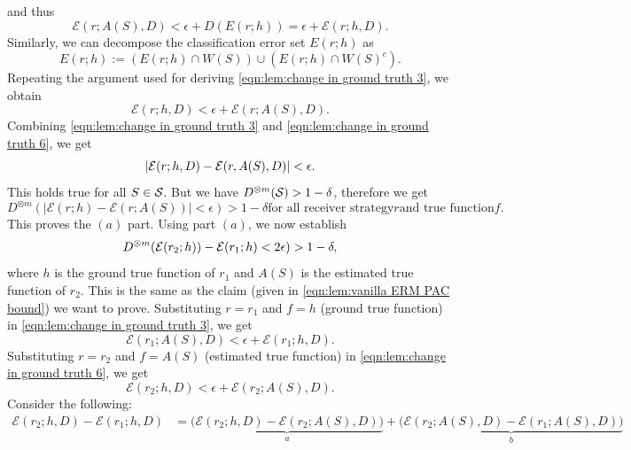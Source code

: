 \begin{apdxproof}
and thus
\begin{equation}\label{eqn:lem:change in ground truth 3}
    \mathcal{E}(r; A(S),D) < \epsilon + D(E(r; h)) = \epsilon + \mathcal{E}(r; h,D).
\end{equation}
Similarly, we can decompose the classification error set $E(r;h)$ as
\[E(r;h) := (E(r;h) \cap W(S)) \cup (E(r;h)\cap W(S)^c).\]
Repeating the argument used for deriving \eqref{eqn:lem:change in ground truth 3}, we obtain
\begin{equation}\label{eqn:lem:change in ground truth 6}
    \mathcal{E}(r; h,D) < \epsilon + \mathcal{E}(r; A(S),D).
\end{equation}
Combining \eqref{eqn:lem:change in ground truth 3} and \eqref{eqn:lem:change in ground truth 6}, we get
\[|\mathcal{E}(r;h,D) - \mathcal{E}(r,A(S),D)| < \epsilon.\] This holds true for all $S \in \mathcal{S}$. But we have $D^{\otimes m}(\mathcal{S}) > 1-\delta$, therefore we get 
\begin{equation}\label{eqn:lem:change in ground truth 5}
    D^{\otimes m}(|\mathcal{E}(r; h) - \mathcal{E}(r; A(S))|  < \epsilon) > 1-\delta \text{for all receiver strategy} r \text{and true function} f.
\end{equation}
This proves the $(a)$ part.
Using part $(a)$, we now establish
\begin{equation}
    D^{\otimes m}(\mathcal{E}(r_2;h)) - \mathcal{E}(r_1;h) < 2\epsilon) > 1-\delta,
\end{equation}
where $h$ is the ground true function of $r_1$ and $A(S)$ is the estimated true function of $r_2$. This is the same as the claim (given in \eqref{eqn:lem:vanilla ERM PAC bound}) we want to prove.
Substituting $r = r_1$ and $f=h$ (ground true function) in \eqref{eqn:lem:change in ground truth 3}, we get
\begin{equation}\label{eqn:lem:change in ground truth 3.1}
    \mathcal{E}(r_1; A(S),D) < \epsilon + \mathcal{E}(r_1; h,D).
\end{equation}
Substituting $r=r_2$ and $f = A(S)$ (estimated true function) in \eqref{eqn:lem:change in ground truth 6}, we get
\begin{equation}\label{eqn:lem:change in ground truth 6 1}
    \mathcal{E}(r_2; h,D) < \epsilon + \mathcal{E}(r_2; A(S),D).
\end{equation}
Consider the following:
\begin{equation}\label{eqn:lem:change in ground truth 4}
\begin{aligned}
    \mathcal{E}(r_2; h,D) - \mathcal{E}(r_1; h,D) &= \underbrace{\big(\mathcal{E}(r_2; h,D) - \mathcal{E}(r_2; A(S),D)\big)}_a  + \underbrace{\big(\mathcal{E}(r_2; A(S),D) - \mathcal{E}(r_1; A(S),D)\big)}_b \\

\end{aligned}
\end{equation}
\end{apdxproof}

